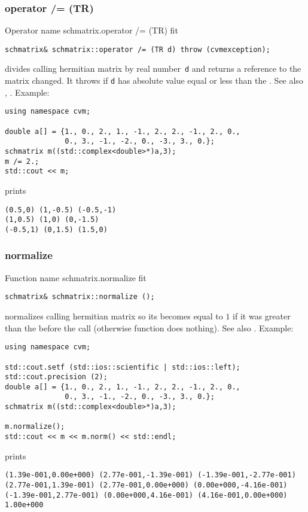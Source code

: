 \subsubsection{operator /= (TR)}
Operator%
\pdfdest name {schmatrix.operator /= (TR)} fit
\begin{verbatim}
schmatrix& schmatrix::operator /= (TR d) throw (cvmexception);
\end{verbatim}
divides  calling hermitian matrix by  real number~\verb"d"
and returns a reference to
the matrix changed.
It throws  
if \verb"d" has  absolute value equal or less
than the 
.
See also ,
.
Example:
\begin{Verbatim}
using namespace cvm;

double a[] = {1., 0., 2., 1., -1., 2., 2., -1., 2., 0.,
              0., 3., -1., -2., 0., -3., 3., 0.};
schmatrix m((std::complex<double>*)a,3);
m /= 2.;
std::cout << m;
\end{Verbatim}
prints
\begin{Verbatim}
(0.5,0) (1,-0.5) (-0.5,-1)
(1,0.5) (1,0) (0,-1.5)
(-0.5,1) (0,1.5) (1.5,0)
\end{Verbatim}
\newpage



\subsubsection{normalize}
Function%
\pdfdest name {schmatrix.normalize} fit
\begin{verbatim}
schmatrix& schmatrix::normalize ();
\end{verbatim}
normalizes  calling hermitian matrix so 
its 
becomes equal to $1$ if it was greater than the 
before the call (otherwise function does nothing).
See also .
Example:
\begin{Verbatim}
using namespace cvm;

std::cout.setf (std::ios::scientific | std::ios::left); 
std::cout.precision (2);
double a[] = {1., 0., 2., 1., -1., 2., 2., -1., 2., 0.,
              0., 3., -1., -2., 0., -3., 3., 0.};
schmatrix m((std::complex<double>*)a,3);

m.normalize();
std::cout << m << m.norm() << std::endl;
\end{Verbatim}
prints
\begin{Verbatim}
(1.39e-001,0.00e+000) (2.77e-001,-1.39e-001) (-1.39e-001,-2.77e-001)
(2.77e-001,1.39e-001) (2.77e-001,0.00e+000) (0.00e+000,-4.16e-001)
(-1.39e-001,2.77e-001) (0.00e+000,4.16e-001) (4.16e-001,0.00e+000)
1.00e+000
\end{Verbatim}
\newpage



